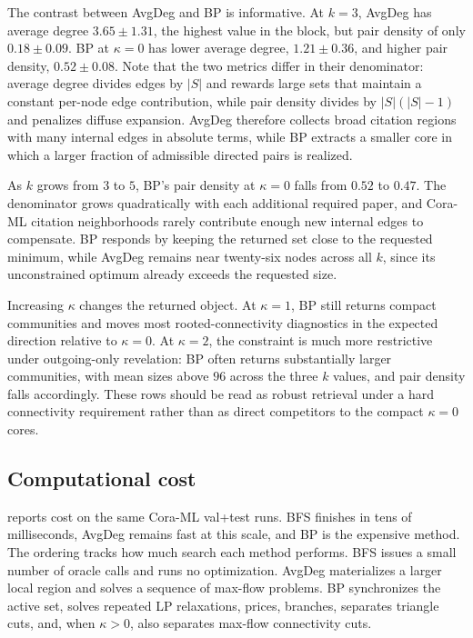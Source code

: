 \documentclass[12pt]{article}
\begin{document}


The contrast between AvgDeg and BP is informative.  At $k=3$, AvgDeg has average degree $3.65\pm1.31$, the highest value in the block, but pair density of only $0.18\pm0.09$.  BP at $\kappa=0$ has lower average degree, $1.21\pm0.36$, and higher pair density, $0.52\pm0.08$.  Note that the two metrics differ in their denominator: average degree divides edges by $|S|$ and rewards large sets that maintain a constant per-node edge contribution, while pair density divides by $|S|(|S|-1)$ and penalizes diffuse expansion.  AvgDeg therefore collects broad citation regions with many internal edges in absolute terms, while BP extracts a smaller core in which a larger fraction of admissible directed pairs is realized.

As $k$ grows from $3$ to $5$, BP's pair density at $\kappa=0$ falls from $0.52$ to $0.47$.  The denominator grows quadratically with each additional required paper, and Cora-ML citation neighborhoods rarely contribute enough new internal edges to compensate.  BP responds by keeping the returned set close to the requested minimum, while AvgDeg remains near twenty-six nodes across all $k$, since its unconstrained optimum already exceeds the requested size.

Increasing $\kappa$ changes the returned object.  At $\kappa=1$, BP still returns compact communities and moves most rooted-connectivity diagnostics in the expected direction relative to $\kappa=0$.  At $\kappa=2$, the constraint is much more restrictive under outgoing-only revelation: BP often returns substantially larger communities, with mean sizes above $96$ across the three $k$ values, and pair density falls accordingly.  These rows should be read as robust retrieval under a hard connectivity requirement rather than as direct competitors to the compact $\kappa=0$ cores.

\subsection{Computational cost}
\label{subsec:cost-results}

 reports cost on the same Cora-ML val+test runs.  BFS finishes in tens of milliseconds, AvgDeg remains fast at this scale, and BP is the expensive method.  The ordering tracks how much search each method performs.  BFS issues a small number of oracle calls and runs no optimization.  AvgDeg materializes a larger local region and solves a sequence of max-flow problems.  BP synchronizes the active set, solves repeated LP relaxations, prices, branches, separates triangle cuts, and, when $\kappa>0$, also separates max-flow connectivity cuts.
\end{document}
